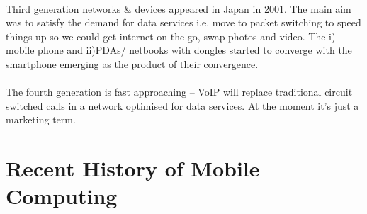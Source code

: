 \paragraph{} Third generation networks \& devices appeared in Japan in 2001. The main aim was to satisfy the demand for data services  i.e. move to packet switching to speed things up so we could get internet-on-the-go, swap photos and video. The i) mobile phone and ii)PDAs/ netbooks with dongles started to converge with the smartphone emerging as the product of their convergence. 

\paragraph{} The fourth generation is fast approaching – VoIP will replace traditional circuit switched calls in a network optimised for data services. At the moment it’s just a marketing term.

\section{Recent History of Mobile Computing}


